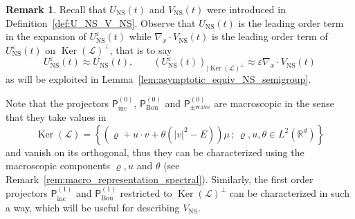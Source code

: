 \documentclass[10pt]{amsart}
\theoremstyle{definition}\newtheorem{defi}[theo]{Definition}\newtheorem{rema}[theo]{Remark}\newtheorem{exam}[theo]{Example}\newtheorem{exem}[theo]{Example}\newtheorem{nota}[theo]{Notation}
\DeclareMathOperator{\nul}{Ker}
\newcommand{\ns}{\mathrm{NS}}
\newcommand{\Wave}{\mathrm{wave}}
\newcommand{\Inc}{\mathrm{inc}}
\newcommand{\Bou}{\mathrm{Bou}}
\newcommand{\R}{\mathbb{R}}
\newcommand{\LL}{\mathcal{L}}
\newcommand{\PP}{\mathsf{P}}
\newcommand*\eps{{\varepsilon}}
\begin{document}
\begin{rema}
Recall that $U_\ns(t)$ and $V_\ns(t)$ were introduced in Definition~\ref{def:U_NS_V_NS}. Observe that $U_\ns(t)$ is the leading order term in the expansion of $U^\eps_\ns(t)$ while $\nabla_x \cdot V_{\ns}(t)$ is the leading order term of $U^\eps_\ns(t)$ on $\nul(\LL)^\perp$, that is to say
\[
U^\eps_\ns(t) \approx U_\ns(t), \qquad \left(U^\eps_\ns(t)\right)_{| \nul(\LL)^\perp } \approx \eps \nabla_{x} \cdot V_\ns(t)
\]
as will be {exploited} in Lemma~\ref{lem:asymptotic_equiv_NS_semigroup}.
\end{rema}

Note that the projectors $\PP_{\Inc}^{(0)}$, $\PP_{\Bou}^{(0)}$ and $\PP_{\pm \Wave}^{(0)}$ are macroscopic in the sense that they take values in
\[
\nul(\LL) = \left\{ \left(\varrho + u \cdot v + \theta \left(|v|^2 - E \right) \right) \mu \, ; \, \varrho, u, \theta \in L^2\left(\R^d \right) \right \}
\]
and vanish on its orthogonal, thus they can be characterized using the macroscopic components $\varrho, u$ and $\theta$ (see Remark~\ref{rem:macro_representation_spectral}). Similarly, the first order projectors $\PP^{(1)}_\Inc$ and $\PP^{(1)}_\Bou$ restricted to $\nul(\LL)^\perp$ can be characterized in such a way, which will be useful for describing $V_\ns$.
\end{document}
